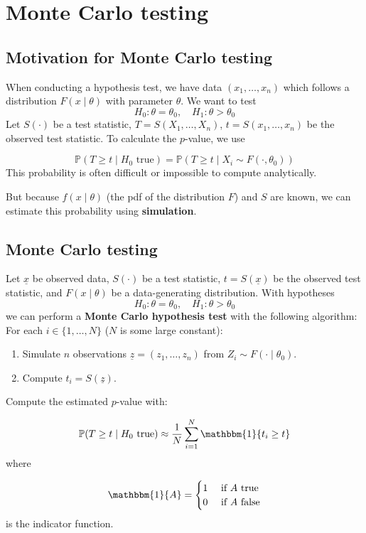 \section{Monte Carlo testing}

\subsection{Motivation for Monte Carlo testing}

When conducting a hypothesis test, we have data $(x_1, \dots, x_n)$ which follows a distribution $F(x \mid \theta)$ with parameter $\theta$. We want to test
\[
	H_0: \theta = \theta_0, \quad H_1: \theta > \theta_0 
\]
Let $S(\cdot)$ be a test statistic, $T = S(X_1, \dots, X_n)$, $t = S(x_1, \dots, x_n)$ be the observed test statistic. To calculate the $p$-value, we use

\[ \mathbb{P}(T \ge t \mid H_0 \text{ true}) = \mathbb{P}(T \ge t \mid X_i \sim F(\cdot, \theta_0)) \]
This probability is often difficult or impossible to compute analytically.

But because $f(x \mid \theta)$ (the pdf of the distribution $F$) and $S$ are known, we can estimate this probability using \textbf{simulation}.

\subsection{Monte Carlo testing}

\begin{definition}
	Let $\underline{x}$ be observed data, $S(\cdot)$ be a test statistic, $t = S(\underline{x})$ be the observed test statistic, and $F(x \mid \theta)$ be a data-generating distribution. With hypotheses
	\[
		H_0: \theta = \theta_0, \quad H_1: \theta > \theta_0
	\]
	we can perform a \textbf{Monte Carlo hypothesis test} with the following algorithm:\\

	For each $i \in \{1, \dots, N\}$ ($N$ is some large constant):
	\begin{enumerate}
		\item Simulate $n$ observations $\underline{z} = (z_1, \dots, z_n)$ from $Z_i \sim F(\cdot \mid \theta_0)$.
		\item Compute $t_i = S(\underline{z})$.
	\end{enumerate}
	Compute the estimated $p$-value with:

	\[ \mathbb{P}(T \ge t \mid H_0 \text{ true}) \approx \frac{1}{N} \sum_{i = 1}^N \mathbbm{1}\{ t_i \ge t \} \]
	where
	
	\[ \mathbbm{1} \{ A \} = \begin{cases}
		1 & \text{ if } A \text{ true}\\
		0 & \text{ if } A \text{ false}
	\end{cases} \]
	is the indicator function.
\end{definition}

